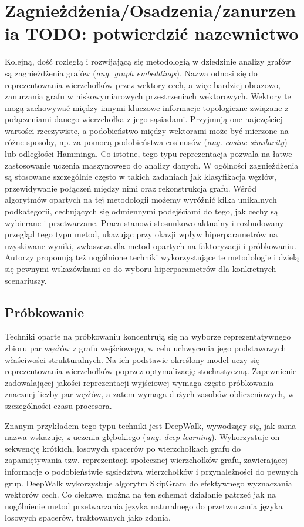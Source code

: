 \section{Zagnieżdżenia/Osadzenia/zanurzenia TODO: potwierdzić nazewnictwo}
    Kolejną, dość rozległą i rozwijającą się metodologią w dziedzinie analizy grafów są zagnieżdżenia grafów (\emph{ang. graph embeddings}). Nazwa odnosi się do reprezentowania wierzchołków przez wektory cech, a więc bardziej obrazowo, zanurzania grafu w niskowymiarowych przestrzeniach wektorowych. Wektory te mogą zachowywać między innymi kluczowe informacje topologiczne związane z połączeniami danego wierzchołka z jego sąsiadami. Przyjmują one najczęściej wartości rzeczywiste, a podobieństwo między wektorami może być mierzone na różne sposoby, np.  za pomocą podobieństwa cosinusów (\emph{ang. cosine similarity}) lub odległości Hamminga\cite{Lian_Zheng_Zheng_Ge_Cao_Tsang_Xie_2018}. Co istotne, tego typu reprezentacja pozwala na łatwe zastosowanie uczenia maszynowego do analizy danych. W ogólności zagnieżdżenia są stosowane szczególnie często w takich zadaniach jak klasyfikacja węzłów, przewidywanie połączeń między nimi oraz rekonstrukcja grafu. Wśród algorytmów opartych na tej metodologii możemy wyróżnić kilka unikalnych podkategorii, cechujących się odmiennymi podejściami do tego, jak cechy są wybierane i przetwarzane. Praca \cite{Yang_Qu_Hussein_Rosso_Cudré-Mauroux_Liu_2023} stanowi stosunkowo aktualny i rozbudowany przegląd tego typu metod, ukazując przy okazji wpływ hiperparametrów na uzyskiwane wyniki, zwłaszcza dla metod opartych na faktoryzacji i próbkowaniu. Autorzy proponują też uogólnione techniki wykorzystujące te metodologie i dzielą się pewnymi wskazówkami co do wyboru hiperparametrów dla konkretnych scenariuszy. 

    \subsection{Próbkowanie}
        Techniki oparte na próbkowaniu koncentrują się na wyborze reprezentatywnego zbioru par węzłów z grafu wejściowego, w celu uchwycenia jego podstawowych właściwości strukturalnych. Na ich podstawie określony model uczy się reprezentowania wierzchołków poprzez optymalizację stochastyczną. Zapewnienie zadowalającej jakości reprezentacji wyjściowej wymaga często próbkowania znacznej liczby par węzłów, a zatem wymaga dużych zasobów obliczeniowych, w szczególności czasu procesora.
            
        Znanym przykładem tego typu techniki jest DeepWalk\cite{Perozzi_Al-Rfou_Skiena_2014}, wywodzący się, jak sama nazwa wskazuje, z uczenia głębokiego (\emph{ang. deep learning}). Wykorzystuje on sekwencję krótkich, losowych spacerów po wierzchołkach grafu do zapamiętywania tzw. reprezentacji społecznej wierzchołków grafu, zawierającej informacje o podobieństwie sąsiedztwa wierzchołków i przynależności do pewnych grup. DeepWalk wykorzystuje algorytm SkipGram do efektywnego wyznaczania wektorów cech. Co ciekawe, można na ten schemat działanie patrzeć jak na uogólnienie metod przetwarzania języka naturalnego do przetwarzania języka losowych spacerów, traktowanych jako zdania. 
        
